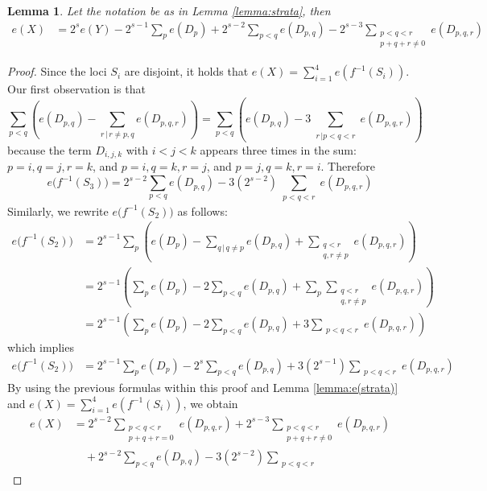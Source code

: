 \documentclass[12pt,twoside,]{amsart}
\theoremstyle{plain}
\newtheorem{lemma}[theorem]{Lemma}
\theoremstyle{definition}
\begin{document}
\begin{lemma}\label{lemma:e_X}
Let the notation be as in Lemma \ref{lemma:strata}, then 
 \begin{align*}
 e(X) &=
2^se(Y)
-2^{s-1}
\sum_{p}e(D_p) 
+
2^{s-2}\sum_{p<q}e(D_{p,q})
-2^{s-3}
\sum_{\substack{p < q <r \\ 
p+q+r \neq 0
} }
e(D_{p,q,r})
 \end{align*}
\end{lemma}
\begin{proof}
Since the loci $S_i$ are disjoint, it holds that
\( e(X)=
 \sum_{i=1}^{4} e(f^{-1}(S_i))\).
 Our first observation is that 
\[
\sum_{p<q}
\left( 
e(D_{p,q}) - \sum_{r \, | \, r \neq p,q}
e(D_{p,q,r})
\right)
=
\sum_{p <q}
\left(
e(D_{p,q}) 
- 3 \sum_{\substack{r \,| p<q<r}}
e(D_{p,q,r})
\right)
\]
because the term $D_{i,j,k}$ with $i < j <k$ appears three times in the sum: $p=i, q=j, r=k$, and $p=i, q = k, r =j$,  and $p=j, q=k, r = i$. Therefore 
\[
e\big(f^{-1}(S_3) \big)
=
2^{s-2}\sum_{p < q} 
e(D_{p,q}) 
- 3(2^{s-2})\sum_{\substack{p <q < r }}
e(D_{p,q,r})
\]
Similarly, we rewrite \(e\big(f^{-1}(S_2) \big)\) as follows: 
\begin{align*}
e\big(f^{-1}(S_2) \big)
&=
2^{s-1}\sum_{p} \left( e(D_p) - 
\sum_{ q \, | \, q \neq p} e(D_{p,q}) + 
\sum_{\substack{q<r\\ q,r\neq p}}
e(D_{p,q,r})
\right)
\\
&= 
2^{s-1}\left(\sum_{p} e(D_p) - 
2 \sum_{ p < q } e(D_{p,q}) + 
\sum_{p}
\sum_{\substack{q<r\\ q,r\neq p}}
e(D_{p,q,r})\right)
\\
&=
2^{s-1}\left(\sum_{p} e(D_p) - 
2 \sum_{ p < q } e(D_{p,q}) + 
3
\sum_{\substack{p<q<r}}
e(D_{p,q,r})\right)
\end{align*}
which implies
\begin{align*}
e\bigl(f^{-1}(S_2)\bigr)
&=
2^{s-1}   \sum_{p}
e(D_p) - 
2^s\sum_{ p< q } e(D_{p,q}) + 
3(2^{s-1})\sum_{\substack{p<q<r}} e(D_{p,q,r})
\end{align*}
By using the previous formulas within this proof and Lemma \ref{lemma:e(strata)} and 
\( e(X)=
 \sum_{i=1}^{4} e(f^{-1}(S_i))\), we obtain
\begin{align*}
 e(X) &=  2^{s-2} 
\sum_{\substack{p<q<r \\ p + q +r  = 0}}
e(D_{p,q,r})
+
2^{s-3} 
\sum_{\substack{p < q <r \\ p+q+r \neq 0} }
e(D_{p,q,r})
\\
& \quad +
2^{s-2}\sum_{p < q} 
e(D_{p,q}) 
- 3(2^{s-2})\sum_{\substack{p <q < r }}

\end{align*}
\end{proof}
\end{document}
